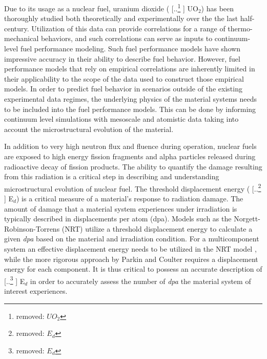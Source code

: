 \documentclass[review]{elsarticle} %
\providecommand{\DIFaddtex}[1]{{\protect\color{blue} \sf #1}} %
\providecommand{\DIFdeltex}[1]{{\protect\color{red} [..\footnote{removed: #1} ]}} %
\providecommand{\DIFaddbegin}{} %
\providecommand{\DIFaddend}{} %
\providecommand{\DIFdelbegin}{} %
\providecommand{\DIFdelend}{} %
\providecommand{\DIFadd}[1]{\texorpdfstring{\DIFaddtex{#1}}{#1}} %
\providecommand{\DIFdel}[1]{\texorpdfstring{\DIFdeltex{#1}}{}} %
\newcommand{\DIFscaledelfig}{0.5}
\newlength{\DIFdelgraphicswidth} %
\newlength{\DIFdelgraphicsheight} %
\newcommand{\DIFaddincludegraphics}[2][]{{\color{blue}\fbox{\DIFOincludegraphics[#1]{#2}}}} %
\newcommand{\DIFdelincludegraphics}[2][]{%
\sbox{\DIFdelgraphicsbox}{\DIFOincludegraphics[#1]{#2}}%
\settoboxwidth{\DIFdelgraphicswidth}{\DIFdelgraphicsbox} %
\settoboxtotalheight{\DIFdelgraphicsheight}{\DIFdelgraphicsbox} %
\scalebox{\DIFscaledelfig}{%
\parbox[b]{\DIFdelgraphicswidth}{\usebox{\DIFdelgraphicsbox}\\[-\baselineskip] \rule{\DIFdelgraphicswidth}{0em}}\llap{\resizebox{\DIFdelgraphicswidth}{\DIFdelgraphicsheight}{%
\setlength{\unitlength}{\DIFdelgraphicswidth}%
\begin{picture}(1,1)%
\thicklines\linethickness{2pt} %
{\color[rgb]{1,0,0}\put(0,0){\framebox(1,1){}}}%
{\color[rgb]{1,0,0}\put(0,0){\line( 1,1){1}}}%
{\color[rgb]{1,0,0}\put(0,1){\line(1,-1){1}}}%
\end{picture}%
}\hspace*{3pt}}} %
} %
\DeclareRobustCommand{\DIFaddbegin}{\DIFOaddbegin \let\includegraphics\DIFaddincludegraphics} %
\DeclareRobustCommand{\DIFaddend}{\DIFOaddend \let\includegraphics\DIFOincludegraphics} %
\DeclareRobustCommand{\DIFdelbegin}{\DIFOdelbegin \let\includegraphics\DIFdelincludegraphics} %
\DeclareRobustCommand{\DIFdelend}{\DIFOaddend \let\includegraphics\DIFOincludegraphics} %
\begin{document}
\hspace{5mm}
Due to its usage as a nuclear fuel, uranium dioxide (\DIFdelbegin \DIFdel{$UO_2$}\DIFdelend \DIFaddbegin \DIFadd{UO$_2$}\DIFaddend ) has been thoroughly studied both theoretically and experimentally over the the last half-century. Utilization of this data can provide correlations for a range of thermo-mechanical behaviors, and such correlations can serve as inputs to continuum-level fuel performance modeling. Such fuel performance models \cite{williamson_et_al_2012, falcon04, bentejac2004, thouvenin2007, sercombe2009} have shown impressive accuracy in their ability to describe fuel behavior. However, fuel performance models that rely on empirical correlations are inherently limited in their applicability to the scope of the data used to construct those empirical models. In order to predict fuel behavior in scenarios outside of the existing experimental data regimes, the underlying physics of the material systems needs to be included into the fuel performance models. This can be done by informing continuum level simulations with mesoscale and atomistic data taking into account the microstructural evolution of the material.

In addition to very high neutron flux and fluence during operation, nuclear fuels are exposed to high energy fission fragments and alpha particles released during radioactive decay of fission products. The ability to quantify the damage resulting from this radiation is a critical step in describing and understanding microstructural evolution of nuclear fuel. The threshold displacement energy (\DIFdelbegin \DIFdel{$E_d$}\DIFdelend \DIFaddbegin \DIFadd{E$_d$}\DIFaddend ) is a critical measure of a material's response to radiation damage. The amount of damage that a material system experiences under irradiation is typically described in displacements per atom (dpa). Models such as the Norgett-Robinson-Torrens (NRT) \cite{nrt} utilize a threshold displacement energy to calculate a given \textit{dpa} based on the material and irradiation condition. \DIFaddbegin \DIFadd{For a multicomponent system an effective displacement energy needs to be utilized in the NRT model \cite{crocombette2016}, while the more rigorous approach by Parkin and Coulter \cite{PC1980} requires a displacement energy for each component. }\DIFaddend It is thus critical to possess an accurate description of \DIFdelbegin \DIFdel{$E_d$ }\DIFdelend \DIFaddbegin \DIFadd{E$_d$ }\DIFaddend in order to accurately assess the number of \textit{dpa} the material system of interest experiences.
\end{document}

